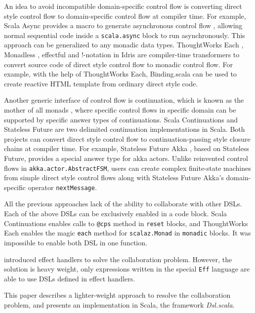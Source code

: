 An idea to avoid incompatible domain-specific control flow is converting direct style control flow to domain-specific control flow at compiler time. For example, Scala Async provides a macro to generate asynchronous control flow \cite{haller2013sip}, allowing normal sequential code inside a \lstinline{scala.async} block to run asynchronously. This approach can be generalized to any monadic data types. ThoughtWorks Each \cite{yangbo2015each}, Monadless \cite{flavio2017monadless}, effectful \cite{crockett2013effectful} and !-notation in Idris \cite{brady2013idris} are compiler-time transformers to convert source code of direct style control flow to monadic control flow. For example, with the help of ThoughtWorks Each, Binding.scala\cite{yangbo2016binding} can be used to create reactive HTML template from ordinary direct style code.

Another generic interface of control flow is continuation, which is known as the mother of all monads \cite{piponi2008mother}, where specific control flows in specific domain can be supported by specific answer types of continuations. Scala Continuations \cite{rompf2009implementing} and Stateless Future \cite{yangbo2014stateless} are two delimited continuation implementations in Scala. Both projects can convert direct style control flow to continuation-passing style closure chains at compiler time. For example, Stateless Future Akka \cite{yangbo2014statelessfutureakka}, based on Stateless Future, provides a special answer type for akka actors. Unlike reinvented control flows in \lstinline{akka.actor.AbstractFSM}, users can create complex finite-state machines from simple direct style control flows along with Stateless Future Akka's domain-specific operator \lstinline{nextMessage}.

All the previous approaches lack of the ability to collaborate with other DSLs. Each of the above DSLs can be exclusively enabled in a code block. Scala Continuations enables calls to \lstinline{@cps} method in \lstinline{reset} blocks, and ThoughtWorks Each enables the magic \lstinline{each} method \cite{yangbo2015each} for \lstinline{scalaz.Monad} in \lstinline{monadic} blocks. It was impossible to enable both DSL in one function.

\cite{kiselyov2013extensible} introduced effect handlers to solve the collaboration problem. However, the solution is heavy weight, only expressions written in the special \lstinline{Eff} language are able to use DSLs defined in effect handlers.

This paper describes a lighter-weight approach to resolve the collaboration problem, and presents an implementation in Scala, the framework \textit{Dsl.scala}.


